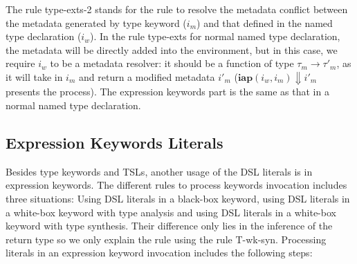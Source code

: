 \documentclass{sig-alternate}
\begin{document}
The rule type-exts-2 stands for the rule to resolve the metadata conflict between the metadata generated by type keyword ($i_m$) and that defined in the named type declaration ($i_w$). In the rule type-exts for normal named type declaration, the metadata will be directly added into the environment, but in this case, we require $i_w$ to be a metadata resolver: it should be a function of type $\tau_m\rightarrow\tau'_m$, as it will take in $i_m$ and return a modified metadata $i'_m$ ($\mathbf{iap}(i_w, i_m)\Downarrow i'_m$ presents the process). The expression keywords part is the same as that in a normal named type declaration.


\subsection{Expression Keywords Literals}
Besides type keywords and TSLs, another usage of the DSL literals is in expression keywords. The different rules to process keywords invocation includes three situations: Using DSL literals in a black-box keyword, using DSL literals in a white-box keyword with type analysis and using DSL literals in a white-box keyword with type synthesis. Their difference only lies in the inference of the return type so we only explain the rule using the rule T-wk-syn. Processing literals in an expression keyword invocation includes the following steps:
\end{document}
